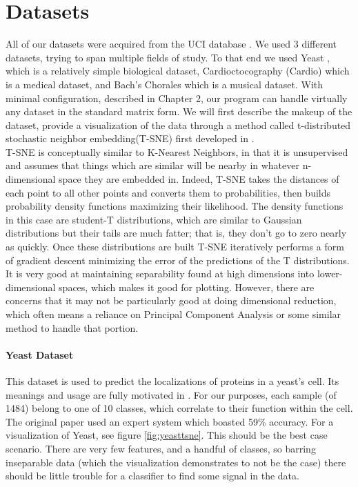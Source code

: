 \section{Datasets}
All of our datasets were acquired from the UCI database \citep{lichman_uci_2013}.  We used 3 different datasets, trying to span multiple fields of study.  To that end we used Yeast \citep{paul_horton_uci_1996}, which is a relatively simple biological dataset, Cardioctocography \citep{j._p._marques_de_sa_uci_2010} (Cardio) which is a medical dataset, and Bach's Chorales \citep{daniele_p._radicioni_uci_2014} which is a musical dataset.  With minimal configuration, described in Chapter 2, our program can handle virtually any dataset in the standard matrix form.  We will first describe the makeup of the dataset, provide a visualization of the data through a method called t-distributed stochastic neighbor embedding(T-SNE) first developed in \cite{maaten_visualizing_2008}.\\
T-SNE is conceptually similar to K-Nearest Neighbors, in that it is unsupervised and assumes that things which are similar will be nearby in whatever n-dimensional space they are embedded in.  Indeed, T-SNE takes the distances of each point to all other points and converts them to probabilities, then builds probability density functions maximizing their likelihood.  The density functions in this case are student-T distributions, which are similar to Gaussian distributions but their tails are much fatter; that is, they don't go to zero nearly as quickly.  Once these distributions are built T-SNE iteratively performs a form of gradient descent minimizing the error of the predictions of the T distributions.  It is very good at maintaining separability found at high dimensions into lower-dimensional spaces, which makes it good for plotting. However, there are concerns that it may not be particularly good at doing dimensional reduction, which often means a reliance on Principal Component Analysis or some similar method to handle that portion\citep{maaten_visualizing_2008}.\\
\paragraph{Yeast Dataset}
This dataset is used to predict the localizations of proteins in a yeast's cell.  Its meanings and usage are fully motivated in \cite{nakai_knowledge_1992}.  For our purposes, each sample (of 1484) belong to one of 10 classes, which correlate to their function within the cell.  The original paper used an expert system which boasted 59\% accuracy.  For a visualization of Yeast, see figure \ref{fig:yeasttsne}.  This should be the best case scenario.  There are very few features, and a handful of classes, so barring inseparable data (which the visualization demonstrates to not be the case) there should be little trouble for a classifier to find some signal in the data.


